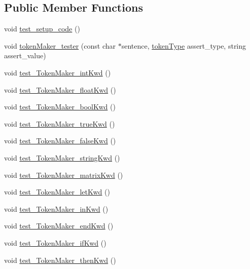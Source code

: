 \subsection*{Public Member Functions}
\begin{DoxyCompactItemize}
\item 
void \hyperlink{classScannerTestSuite_ade832b9b4b3bd92980d43c4050cebd2c}{test\-\_\-setup\-\_\-code} ()
\item 
void \hyperlink{classScannerTestSuite_a5e21a0f6ee7ed2ab19791be13a41ba0a}{token\-Maker\-\_\-tester} (const char $\ast$sentence, \hyperlink{scanner_8h_ab7f9b765cab7ed98e5a7f05690f6a061}{token\-Type} assert\-\_\-type, string assert\-\_\-value)
\item 
void \hyperlink{classScannerTestSuite_afd03fbc31003d1be155fba2a3c98b71c}{test\-\_\-\-Token\-Maker\-\_\-int\-Kwd} ()
\item 
void \hyperlink{classScannerTestSuite_a78fc1b6a686d36de0d9653aaddf4ad88}{test\-\_\-\-Token\-Maker\-\_\-float\-Kwd} ()
\item 
void \hyperlink{classScannerTestSuite_a816712d2c5ec0ef7ef3361dc5a80eb51}{test\-\_\-\-Token\-Maker\-\_\-bool\-Kwd} ()
\item 
void \hyperlink{classScannerTestSuite_aa9d32f82e08ccc810fca495f4628c2a7}{test\-\_\-\-Token\-Maker\-\_\-true\-Kwd} ()
\item 
void \hyperlink{classScannerTestSuite_ab96166b93c96fea8c7e4c5cc44961d39}{test\-\_\-\-Token\-Maker\-\_\-false\-Kwd} ()
\item 
void \hyperlink{classScannerTestSuite_a15ec232bf3903ec8527b0a3e37cc443e}{test\-\_\-\-Token\-Maker\-\_\-string\-Kwd} ()
\item 
void \hyperlink{classScannerTestSuite_a5d766dff9b08ee580133f042d9e42ea1}{test\-\_\-\-Token\-Maker\-\_\-matrix\-Kwd} ()
\item 
void \hyperlink{classScannerTestSuite_a6d80c8fac5af9493b09c0cafa42191bf}{test\-\_\-\-Token\-Maker\-\_\-let\-Kwd} ()
\item 
void \hyperlink{classScannerTestSuite_a8e25d2acae63b70ed01f2b59e679c92c}{test\-\_\-\-Token\-Maker\-\_\-in\-Kwd} ()
\item 
void \hyperlink{classScannerTestSuite_a37ea34a026825d99f924771fa4c22e39}{test\-\_\-\-Token\-Maker\-\_\-end\-Kwd} ()
\item 
void \hyperlink{classScannerTestSuite_a967f3d747c68bb95433fcd63d9180051}{test\-\_\-\-Token\-Maker\-\_\-if\-Kwd} ()
\item 
void \hyperlink{classScannerTestSuite_af0484460a87be267d9f6faa6897561c4}{test\-\_\-\-Token\-Maker\-\_\-then\-Kwd} ()

\end{DoxyCompactItemize}
